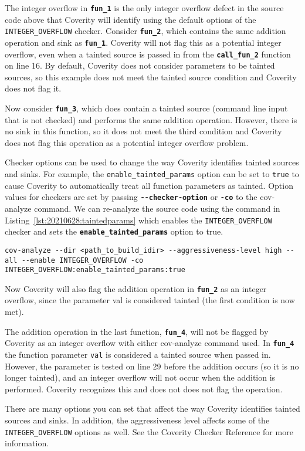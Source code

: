 The integer overflow in \textbf{\texttt{fun\_1}} is the only integer overflow defect in the source code above that Coverity will identify using the default options of the \texttt{INTEGER\_OVERFLOW} checker. Consider \textbf{\texttt{fun\_2}}, which contains the same addition operation and sink as \textbf{\texttt{fun\_1}}. Coverity will not flag this as a potential integer overflow, even when a tainted source is passed in from the \textbf{\texttt{call\_fun\_2}} function on line 16. By default, Coverity does not consider parameters to be tainted sources, so this example does not meet the tainted source condition and Coverity does not flag it.

Now consider \textbf{\texttt{fun\_3}}, which does contain a tainted source (command line input that is not checked) and performs the same addition operation. However, there is no sink in this function, so it does not meet the third condition and Coverity does not flag this operation as a potential integer overflow problem.

Checker options can be used to change the way Coverity identifies tainted sources and sinks. For example, the \texttt{enable\_tainted\_params} option can be set to \texttt{true} to cause Coverity to automatically treat all function parameters as tainted. Option values for checkers are set by passing \textbf{\texttt{-{}-checker-option}} or \textbf{\texttt{-co}} to the cov-analyze command. We can re-analyze the source code using the command in Listing~\ref{lst:20210628:taintedparams} which enables the \texttt{INTEGER\_OVERFLOW} checker and sets the \textbf{\texttt{enable\_tainted\_params}} option to true.
\begin{lstlisting}[caption={Cov-analyze Parameters for Tainted Parameters},captionpos=b,style=BashStyle,basicstyle=\small,label={lst:20210628:taintedparams},literate=*{-}{-}1,breaklines=true]
cov-analyze --dir <path_to_build_idir> --aggressiveness-level high --all --enable INTEGER_OVERFLOW -co INTEGER_OVERFLOW:enable_tainted_params:true
\end{lstlisting}

Now Coverity will also flag the addition operation in \textbf{\texttt{fun\_2}} as an integer overflow, since the parameter val is considered tainted (the first condition is now met).

The addition operation in the last function, \textbf{\texttt{fun\_4}}, will not be flagged by Coverity as an integer overflow with either cov-analyze command used. In \textbf{\texttt{fun\_4}} the function parameter \texttt{val} is considered a tainted source when passed in. However, the parameter is tested on line 29 before the addition occurs (so it is no longer tainted), and an integer overflow will not occur when the addition is performed. Coverity recognizes this and does not does not flag the operation.

There are many options you can set that affect the way Coverity identifies tainted sources and sinks. In addition, the aggressiveness level affects some of the \texttt{INTEGER\_OVERFLOW} options as well. See the Coverity Checker Reference\autocite{20210628:coverity} for more information.

